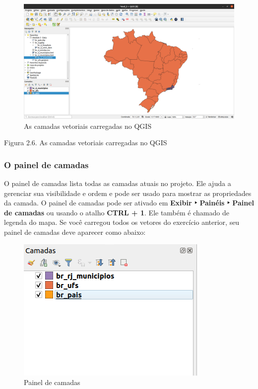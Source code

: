 \documentclass[
]{book}
\begin{document}
\begin{figure}
\centering
\includegraphics{media/modulo2/vector-layers-loaded-1.png}
\caption{As camadas vetoriais carregadas no QGIS}
\end{figure}

Figura 2.6. As camadas vetoriais carregadas no QGIS

\hypertarget{o-painel-de-camadas}{%
\subsubsection{\texorpdfstring{\textbf{O painel de camadas}}{O painel de camadas}}\label{o-painel-de-camadas}}

O painel de camadas lista todas as camadas atuais no projeto. Ele ajuda a gerenciar sua visibilidade e ordem e pode ser usado para mostrar as propriedades da camada. O painel de camadas pode ser ativado em \textbf{Exibir ‣ Painéis ‣ Painel de camadas} ou usando o atalho \textbf{CTRL + 1}. Ele também é chamado de legenda do mapa. Se você carregou todos os vetores do exercício anterior, seu painel de camadas deve aparecer como abaixo:

\begin{figure}
\centering
\includegraphics{media/modulo2/layers-panel-1.png}
\caption{Painel de camadas}
\end{figure}
\end{document}
